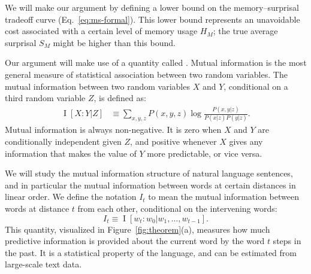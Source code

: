 We will make our argument by defining a lower bound on the memory--surprisal tradeoff curve (Eq.~\ref{eq:ms-formal}). This lower bound represents an unavoidable cost associated with a certain level of memory usage $H_M$; the true average surprisal $S_M$ might be higher than this bound. 

Our argument will make use of a quantity called . Mutual information is the most general measure of statistical association between two random variables. The mutual information between two random variables $X$ and $Y$, conditional on a third random variable $Z$, is defined as:
\begin{align}
\label{eq:mi}
    \operatorname{I}[X:Y|Z] &\equiv \sum_{x,y,z} P(x,y,z) \log \frac{P(x,y|z)}{P(x|z)P(y|z)}. %
\end{align}
Mutual information is always non-negative. It is zero when $X$ and $Y$ are conditionally independent given $Z$, and positive whenever $X$ gives any information that makes the value of $Y$ more predictable, or vice versa. 

We will study the mutual information structure of natural language sentences, and in particular the mutual information between words at certain distances in linear order. We define the notation $I_t$ to mean the mutual information between words at distance $t$ from each other, conditional on the intervening words:
\begin{equation*}
    I_t \equiv \operatorname{I}[w_t : w_0 | w_1, \dots, w_{t-1}].
\end{equation*}
This quantity, visualized in Figure~\ref{fig:theorem}(a), measures how much predictive information is provided about the current word by the word $t$ steps in the past.
It is a statistical property of the language, and can be estimated from large-scale text data.

